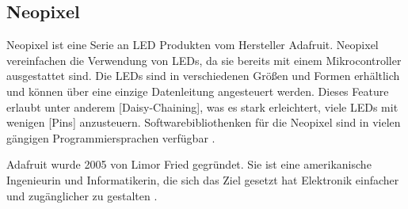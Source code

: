 \subsection{Neopixel}
\label{sec:neopixel}

Neopixel ist eine Serie an LED Produkten vom Hersteller Adafruit. Neopixel vereinfachen die Verwendung von LEDs, da sie bereits mit einem Mikrocontroller ausgestattet sind. Die LEDs sind in verschiedenen Größen und Formen erhältlich und können über eine einzige Datenleitung angesteuert werden. Dieses Feature erlaubt unter anderem [Daisy-Chaining], was es stark erleichtert, viele LEDs mit wenigen [Pins] anzusteuern. Softwarebibliothenken für die Neopixel sind in vielen gängigen Programmiersprachen verfügbar .

Adafruit wurde 2005 von Limor Fried gegründet. Sie ist eine amerikanische Ingenieurin und Informatikerin, die sich das Ziel gesetzt hat Elektronik einfacher und zugänglicher zu gestalten .